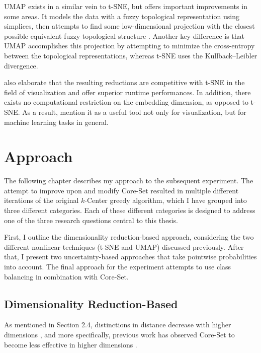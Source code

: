 \documentclass[english,bachelor,ul]{webisthesis} %
\begin{document}
UMAP exists in a similar vein to t-SNE, but offers important improvements in some areas. It models the data with a fuzzy topological representation using simplices, then attempts to find some low-dimensional projection with the closest possible equivalent fuzzy topological structure \citep{DBLP:journals/corr/abs-1802-03426}. Another key difference is that UMAP accomplishes this projection by attempting to minimize the cross-entropy between the topological representations, whereas t-SNE uses the Kullback--Leibler divergence. 

\cite{DBLP:journals/corr/abs-1802-03426} also elaborate that the resulting reductions are competitive with t-SNE in the field of visualization and offer superior runtime performances. In addition, there exists no computational restriction on the embedding dimension, as opposed to t-SNE. As a result, \cite{DBLP:journals/corr/abs-1802-03426} mention it as a useful tool not only for visualization, but for machine learning tasks in general.

\chapter{Approach}

The following chapter describes my approach to the subsequent experiment. The attempt to improve upon and modify Core-Set resulted in multiple different iterations of the original $k$-Center greedy algorithm, which I have grouped into three different categories. Each of these different categories is designed to address one of the three research questions central to this thesis. 

First, I outline the dimensionality reduction-based approach, considering the two different nonlinear techniques (t-SNE and UMAP) discussed previously. After that, I present two uncertainty-based approaches that take pointwise probabilities into account. The final approach for the experiment attempts to use class balancing in combination with Core-Set.

\section{Dimensionality Reduction-Based}

As mentioned in Section 2.4, distinctions in distance decrease with higher dimensions \citep{DBLP:conf/icdt/BeyerGRS99}, and more specifically, previous work has observed Core-Set to become less effective in higher dimensions \citep{DBLP:conf/iccv/SinhaED19}.
\end{document}
